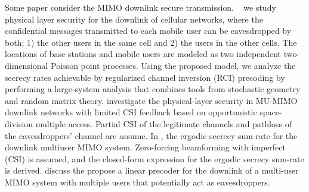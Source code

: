 \documentclass[12pt,journal,draftclsnofoot,onecolumn]{IEEEtran}
\begin{document}
%


Some paper consider the MIMO downlink secure transmission. ~\cite{geraci2014physical} we study physical layer security for the downlink of cellular networks, where the confidential messages transmitted to each mobile user can be eavesdropped by both; 1) the other users in the same cell and 2) the users in the other cells. The locations of base stations and mobile users are modeled as two independent two-dimensional Poisson point processes. Using
the proposed model, we analyze the secrecy rates achievable by regularized channel inversion (RCI) precoding by performing a large-system analysis that combines tools from stochastic geometry
and random matrix theory. \cite{chen2015mode} investigate the physical-layer security in
MU-MIMO downlink networks with limited CSI feedback
based on opportunistic
space-division multiple access. Partial CSI of the legitimate channels and pathloss of the eavesdroppers' channel are assume. In \cite{zou_improving_2015}, the ergodic secrecy sum-rate for the downlink multiuser MIMO system. Zero-forcing beamforming with imperfect (CSI) is assumed, and the closed-form expression for the ergodic
secrecy sum-rate is derived. \cite{geraci2012secrecy} discuss the propose a linear precoder for the downlink of a multi-user MIMO system with multiple users that
potentially act as eavesdroppers.
\end{document}
